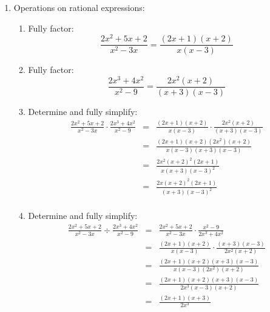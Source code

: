 \documentclass[letterpaper,12pt,fleqn]{article}
\begin{document}
\begin{enumerate}
\newcommand{\rea}{\frac{2x^2+5x+2}{x^2-3x}}
\newcommand{\reb}{\frac{2x^3+4x^2}{x^2-9}}

\item Operations on rational expressions:
  \begin{enumerate}
  \item Fully factor:
    \[\rea=\frac{(2x+1)(x+2)}{x(x-3)}\]
    
  \item Fully factor:
    \[\reb=\frac{2x^2(x+2)}{(x+3)(x-3)}\]
    
  \item Determine and fully simplify:
    \begin{eqnarray*}
      \rea\cdot\reb &=&
      \frac{(2x+1)(x+2)}{x(x-3)}\cdot\frac{2x^2(x+2)}{(x+3)(x-3)} \\
      &=& \frac{(2x+1)(x+2)(2x^2)(x+2)}{x(x-3)(x+3)(x-3)} \\
      &=& \frac{2x^2(x+2)^2(2x+1)}{x(x+3)(x-3)^2} \\
      &=& \frac{2x(x+2)^2(2x+1)}{(x+3)(x-3)^2} \\
    \end{eqnarray*}
    
  \item Determine and fully simplify:
    \begin{eqnarray*}
      \rea\div\reb &=& \rea\cdot\frac{x^2-9}{2x^3+4x^2} \\
      &=& \frac{(2x+1)(x+2)}{x(x-3)}\cdot\frac{(x+3)(x-3)}{2x^2(x+2)} \\
      &=& \frac{(2x+1)(x+2)(x+3)(x-3)}{x(x-3)(2x^2)(x+2)} \\
      &=& \frac{(2x+1)(x+2)(x+3)(x-3)}{2x^3(x-3)(x+2)} \\
      &=& \frac{(2x+1)(x+3)}{2x^3} \\
    \end{eqnarray*}
  \end{enumerate}
\end{enumerate}
\end{document}
